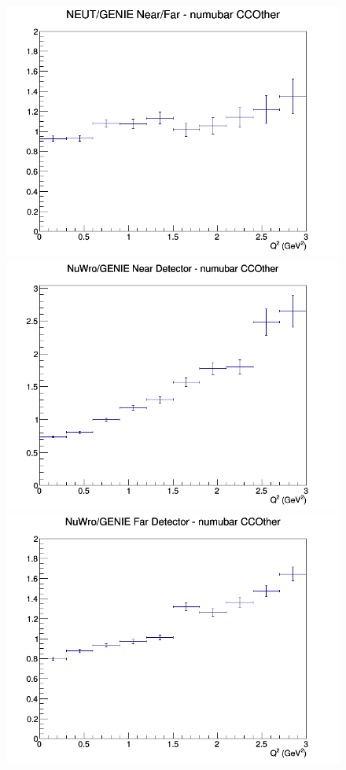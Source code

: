 \begin{figure}[h]
\endminipage
{}
\includegraphics[width=\linewidth]{eff_Q2/LAr/ratios/CCOther_NEUT_GENIE_numubar_NF_Q2.png}
\endminipage
\newline
{}
\includegraphics[width=\linewidth]{eff_Q2/LAr/ratios/CCOther_NuWro_GENIE_numubar_near_Q2.png}
\endminipage
{}
\includegraphics[width=\linewidth]{eff_Q2/LAr/ratios/CCOther_NuWro_GENIE_numubar_far_Q2.png}

\end{figure}
